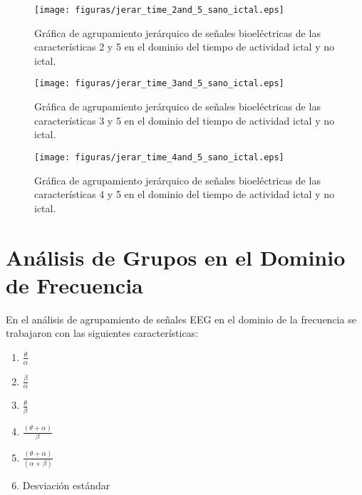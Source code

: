 \begin{figure}[H]
    \centering
    \texttt{[image: figuras/jerar\_time\_2and\_5\_sano\_ictal.eps]}
    \caption{Gráfica de agrupamiento jerárquico de señales bioeléctricas de las características 2 y 5 en el dominio del tiempo  de actividad ictal y no ictal.}
    \label{fig: jerar_Time_2_5}
\end{figure}

\begin{figure}[H]
    \centering
    \texttt{[image: figuras/jerar\_time\_3and\_5\_sano\_ictal.eps]}
    \caption{Gráfica de agrupamiento jerárquico de señales bioeléctricas de las características 3 y 5 en el dominio del tiempo  de actividad ictal y no ictal.}
    \label{fig: jerar_Time_3_5}
\end{figure}
\begin{figure}[H]
    \centering
    \texttt{[image: figuras/jerar\_time\_4and\_5\_sano\_ictal.eps]}
    \caption{Gráfica de agrupamiento jerárquico de señales bioeléctricas de las características 4 y 5 en el dominio del tiempo  de actividad ictal y no ictal.}
    \label{fig: jerar_Time_4_5}
\end{figure}






\section{Análisis de Grupos en el Dominio de Frecuencia}
En el análisis de agrupamiento de señales EEG en el dominio de la frecuencia se trabajaron con las siguientes características:

\begin{enumerate}
    \item $\frac{\theta}{\alpha}$
    \item $\frac{\beta}{\alpha}$
    \item $\frac{\theta}{\beta}$
    \item $\frac{(\theta + \alpha)}{\beta}$
    \item $\frac{(\theta + \alpha)}{(\alpha + \beta)}$
    \item Desviación estándar
\end{enumerate}



